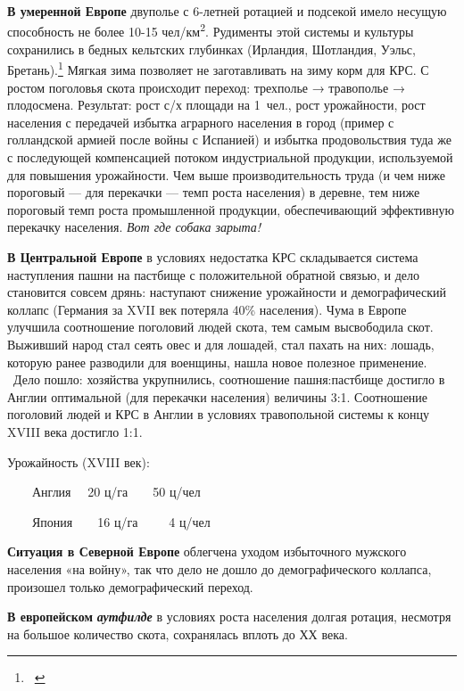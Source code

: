 \documentclass[twoside,a4paper]{article}
\begin{document}
{
\textbf{В умеренной Европе} двуполье с 6-летней ротацией и подсекой имело несущую способность не более 10-15
чел/км\textsuperscript{2}. Рудименты этой системы и культуры сохранились в бедных кельтских глубинках (Ирландия,
Шотландия, Уэльс, Бретань).\footnote{\ \par } Мягкая зима позволяет не заготавливать на зиму корм для КРС. С ростом
поголовья скота происходит переход: трехполье → травополье → плодосмена. Результат: рост с/х площади на 1~чел., рост
урожайности, рост населения с передачей избытка аграрного населения в город (пример с голландской армией после войны с
Испанией) и избытка продовольствия туда же с последующей компенсацией потоком индустриальной продукции, используемой
для повышения урожайности. Чем выше производительность труда (и чем ниже пороговый — для перекачки — темп роста
населения) в деревне, тем ниже пороговый темп роста промышленной продукции, обеспечивающий эффективную перекачку
населения. \textit{Вот где собака зарыта!}}

{
\textbf{В Центральной Европе} в условиях недостатка КРС складывается система наступления пашни на пастбище с
положительной обратной связью, и дело становится совсем дрянь: наступают снижение урожайности и демографический коллапс
(Германия за XVII век потеряла 40\% населения). Чума в Европе улучшила соотношение поголовий людей скота, тем самым
высвободила скот. Выживший народ стал сеять овес и для лошадей, стал пахать на них: лошадь, которую ранее разводили для
военщины, нашла новое полезное применение. \ Дело пошло: хозяйства укрупнились, соотношение пашня:пастбище достигло в
Англии оптимальной (для перекачки населения) величины 3:1. Соотношение поголовий людей и КРС в Англии в условиях
травопольной системы к концу XVIII века достигло 1:1. }

{
Урожайность (\foreignlanguage{english}{XVIII} век):}

{
\ \ \ \ Англия \ \ 20 ц/га\ \ \ \ 50 ц/чел}

{
\ \ \ \ Япония\ \ \ \ 16 ц/га\ \ \ \  \ 4 ц/чел}

{
\textbf{Ситуация в Северной Европе} облегчена уходом избыточного мужского населения «на войну», так что дело не дошло до
демографического коллапса, произошел только демографический переход.}

{
\textbf{В европейском }\textbf{\textit{аутфилде}} в условиях роста населения долгая ротация, несмотря на большое
количество скота, сохранялась вплоть до ХХ века.}
\end{document}
